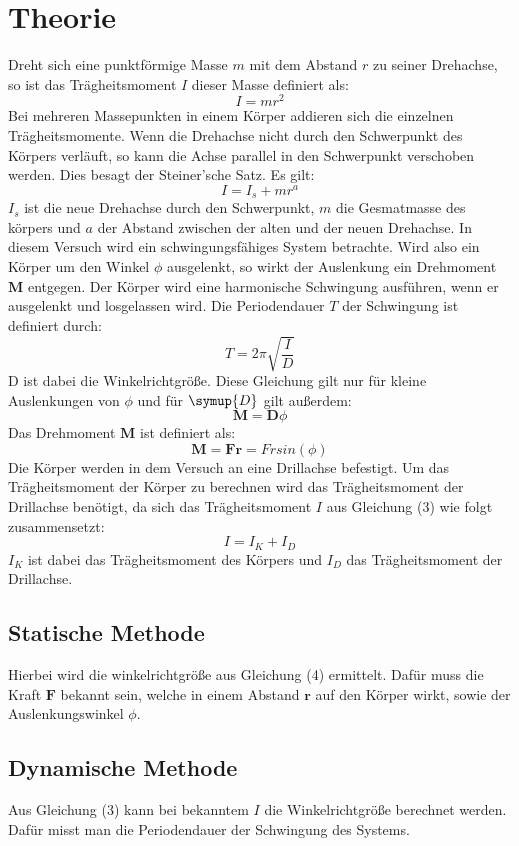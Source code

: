 \section{Theorie}
\label{sec:Theorie}

\cite{sample}
Dreht sich eine punktförmige Masse $m$ mit dem Abstand $r$ zu seiner Drehachse, so
ist das Trägheitsmoment $I$ dieser Masse definiert als:
\begin{equation}
  I = m r^2
\end{equation}
Bei mehreren Massepunkten in einem Körper addieren sich die einzelnen
Trägheitsmomente.
Wenn die Drehachse nicht durch den Schwerpunkt des Körpers verläuft, so kann
die Achse parallel in den Schwerpunkt verschoben werden. Dies besagt der Steiner'sche
Satz. Es gilt:
\begin{equation}
  I = I_s + m r^a
\end{equation}
$I_s$ ist die neue Drehachse durch den Schwerpunkt, $m$ die Gesmatmasse
des körpers und $a$ der Abstand zwischen der alten und der neuen Drehachse.
In diesem Versuch wird ein schwingungsfähiges System betrachte. Wird also ein Körper
um den Winkel $\phi$ ausgelenkt, so wirkt der Auslenkung ein Drehmoment $\symbf{M}$ entgegen.
Der Körper wird eine harmonische Schwingung ausführen, wenn er ausgelenkt und
losgelassen wird. Die Periodendauer $T$ der Schwingung ist definiert durch:
\begin{equation}
  T = 2 \pi \sqrt{\frac{I}{D}}
\end{equation}
D ist dabei die Winkelrichtgröße. Diese Gleichung gilt nur für
kleine Auslenkungen von $\phi$ und für $\symup{D}$ gilt außerdem:
\begin{equation}
  \symbf{M} = \symbf{D} \phi
\end{equation}
Das Drehmoment $\symbf{M}$ ist definiert als:
\begin{equation}
  \symbf{M} = \symbf{F}{\symbf{r}} = F r sin(\phi)
\end{equation}
Die Körper werden in dem Versuch an eine Drillachse befestigt. Um das Trägheitsmoment
der Körper zu berechnen wird das Trägheitsmoment der Drillachse benötigt, da sich
das Trägheitsmoment $I$ aus Gleichung (3) wie folgt zusammensetzt:
\begin{equation}
  I = I_K + I_D
\end{equation}
$I_K$ ist dabei das Trägheitsmoment des Körpers und $I_D$ das
Trägheitsmoment der Drill\-achse.
\subsection{Statische Methode}
Hierbei wird die winkelrichtgröße aus Gleichung (4) ermittelt. Dafür muss die
Kraft $\symbf{F}$ bekannt sein, welche in einem Abstand $\symbf{r}$ auf den Körper wirkt,
sowie der Auslenkungswinkel $\phi$.
\subsection{Dynamische Methode}
Aus Gleichung (3) kann bei bekanntem $I$ die Winkelrichtgröße berechnet werden. Dafür
misst man die Periodendauer der Schwingung des Systems.
